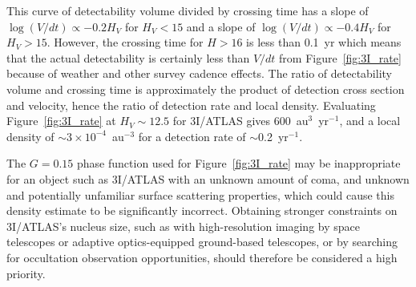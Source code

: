 \documentclass[twocolumn,longbib]{aastex7}
\begin{document}
\begin{CJK*}{UTF8}{gbsn}
This curve of detectability volume divided by crossing time has a slope of $\log(V/dt)\propto -0.2H_V$ for $H_V<15$ and a slope of $\log(V/dt)\propto -0.4H_V$ for $H_V>15$.  However, the crossing time for $H>16$ is less than 0.1~yr which means that the actual detectability is certainly less than $V/dt$ from Figure~\ref{fig:3I_rate} because of weather and other survey cadence effects.
The ratio of detectability volume and crossing time is approximately the product of detection cross section and velocity, hence the ratio of detection rate and local density.  Evaluating Figure~\ref{fig:3I_rate} at $H_V\sim12.5$ for 3I/ATLAS gives $600$~au$^3$~yr$^{-1}$, and a local density of $\sim3\times10^{-4}$~au$^{-3}$ for a detection rate of $\sim$0.2~yr$^{-1}$.

The $G=0.15$ phase function used for Figure~\ref{fig:3I_rate} may be inappropriate for an object such as 3I/ATLAS with an unknown amount of coma, and unknown and potentially unfamiliar surface scattering properties, which could cause this density estimate to be significantly incorrect.  Obtaining stronger constraints on 3I/ATLAS's nucleus size, such as with high-resolution imaging by space telescopes or adaptive optics-equipped ground-based telescopes, or by searching for occultation observation opportunities, should therefore be considered a high priority.



\end{CJK*}
\end{document}
